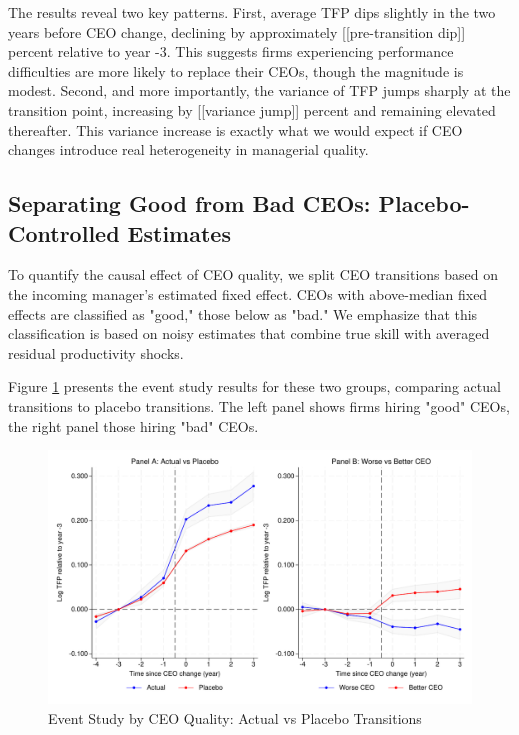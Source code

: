 \documentclass[11pt,a4paper]{article}
\begin{document}
The results reveal two key patterns. First, average TFP dips slightly in the two years before CEO change, declining by approximately [[pre-transition dip]] percent relative to year -3. This suggests firms experiencing performance difficulties are more likely to replace their CEOs, though the magnitude is modest. Second, and more importantly, the variance of TFP jumps sharply at the transition point, increasing by [[variance jump]] percent and remaining elevated thereafter. This variance increase is exactly what we would expect if CEO changes introduce real heterogeneity in managerial quality.

\subsection{Separating Good from Bad CEOs: Placebo-Controlled Estimates}

To quantify the causal effect of CEO quality, we split CEO transitions based on the incoming manager's estimated fixed effect. CEOs with above-median fixed effects are classified as "good," those below as "bad." We emphasize that this classification is based on noisy estimates that combine true skill with averaged residual productivity shocks.

Figure \ref{fig:event_study_split} presents the event study results for these two groups, comparing actual transitions to placebo transitions. The left panel shows firms hiring "good" CEOs, the right panel those hiring "bad" CEOs.

\begin{figure}[htbp]
\centering
\includegraphics[width=\textwidth]{figure/event_study.pdf}
\caption{Event Study by CEO Quality: Actual vs Placebo Transitions}
\label{fig:event_study_split}
\end{figure}
\end{document}
